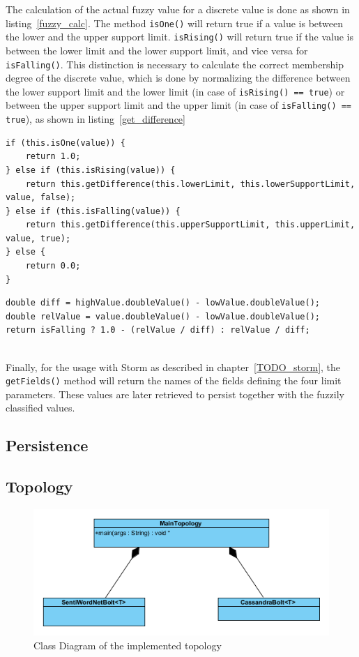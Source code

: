 \documentclass[a4paper]{article}
\begin{document}
The calculation of the actual fuzzy value for a discrete value is done as shown in listing~\ref{fuzzy_calc}. The method \texttt{isOne()} will return true if a value is between the lower and the upper support limit. \texttt{isRising()} will return true if the value is between the lower limit and the lower support limit, and vice versa for \texttt{isFalling()}. This distinction is necessary to calculate the correct membership degree of the discrete value, which is done by normalizing the difference between the lower support limit and the lower limit (in case of \texttt{isRising() == true}) or between the upper support limit and the upper limit (in case of \texttt{isFalling() == true}), as shown in listing~\ref{get_difference}
\begin{lstlisting}
if (this.isOne(value)) {
	return 1.0;
} else if (this.isRising(value)) {
	return this.getDifference(this.lowerLimit, this.lowerSupportLimit, value, false);
} else if (this.isFalling(value)) {
	return this.getDifference(this.upperSupportLimit, this.upperLimit, value, true);
} else {
	return 0.0;
}
\end{lstlisting}
\begin{lstlisting}
double diff = highValue.doubleValue() - lowValue.doubleValue();
double relValue = value.doubleValue() - lowValue.doubleValue();
return isFalling ? 1.0 - (relValue / diff) : relValue / diff;
 
\end{lstlisting}

Finally, for the usage with Storm as described in chapter~\ref{TODO_storm}, the \texttt{getFields()} method will return the names of the fields defining the four limit parameters. These values are later retrieved to persist together with the fuzzily classified values.

\subsection{Persistence}


\subsection{Topology}\label{section_topology}
\begin{center}
\begin{figure}[h!]
	\centering
	\includegraphics{images/uml_topology.png}
	\caption{Class Diagram of the implemented topology}
	\label{uml_topology}
\end{figure}
\end{center}
\end{document}
